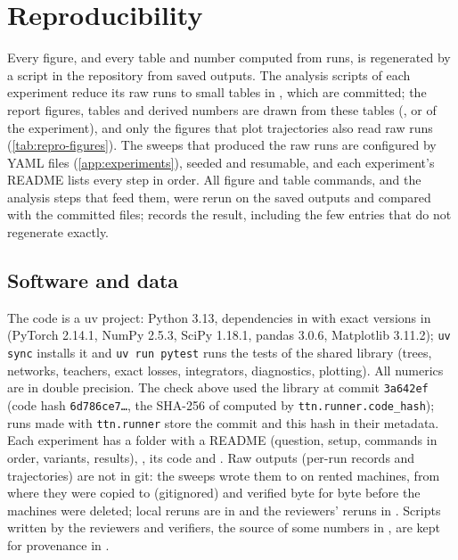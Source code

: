\section{Reproducibility}\label{app:reproducibility}

Every figure, and every table and number computed from runs, is regenerated by a script in the
repository from saved outputs. The analysis scripts of each experiment reduce its raw runs to small
tables in , which are committed; the report figures, tables and
derived numbers are drawn from these tables (,  or
 of the experiment), and only the figures that plot trajectories also read raw
runs (\cref{tab:repro-figures}). The sweeps that produced the raw runs are configured by YAML files
(\cref{app:experiments}), seeded and resumable, and each experiment's README lists every step in
order. All figure and table commands, and the analysis steps that feed them, were rerun on the saved
outputs and compared with the committed files;  records
the result, including the few entries that do not regenerate exactly.

\subsection{Software and data}\label{app:repro-software}
The code is a uv project: Python 3.13, dependencies in  with exact versions in
 (PyTorch 2.14.1, NumPy 2.5.3, SciPy 1.18.1, pandas 3.0.6, Matplotlib 3.11.2);
\texttt{uv sync} installs it and \texttt{uv run pytest} runs the tests of the shared library
 (trees, networks, teachers, exact losses, integrators, diagnostics, plotting). All
numerics are in double precision. The check above used the library at commit \texttt{3a642ef} (code
hash \texttt{6d786ce7\ldots}, the SHA-256 of  computed by \texttt{ttn.runner.code\_hash});
runs made with \texttt{ttn.runner} store the commit and this hash in their metadata.
Each experiment has a folder  with a README (question, setup, commands in
order, variants, results), , its code and . Raw outputs (per-run
records and trajectories) are not in git: the sweeps wrote them to  on
rented machines, from where they were copied to  (gitignored) and verified byte for
byte before the machines were deleted; local reruns are in  and the
reviewers' reruns in . Scripts written by the reviewers and verifiers, the
source of some numbers in , are kept for provenance in
.

